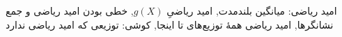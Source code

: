 \documentclass[a4paper,11pt,oneside,openany]{book}
\begin{document}
  {{امید ریاضی: میانگین بلندمدت},
   {امید ریاضیِ $g(X)$},
   {خطی بودن امید ریاضی و جمع نشانگرها},
   {امید ریاضی همهٔ توزیع‌های تا اینجا},
   {کوشی: توزیعی که امید ریاضی ندارد}}

\mainmatter
\setcounter{chapter}{10}   %

\end{document}
